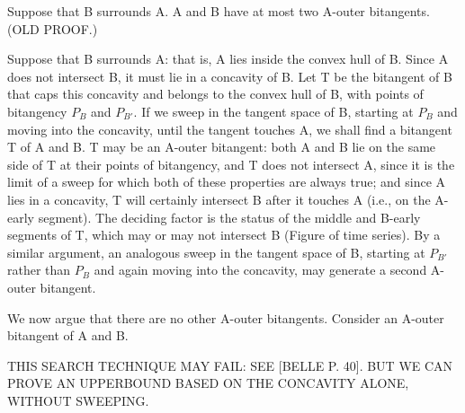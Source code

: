 \documentclass[12pt]{article}
\newif\ifCommentary             %
\begin{document}
\begin{lemma}
\label{lem:Aouter}
\ifCommentary
Let A and B be closed curves whose interiors have no intersection.
\fi
Suppose that B surrounds A.
A and B have at most two A-outer bitangents.  (OLD PROOF.)
\end{lemma}
\prf
Suppose that B surrounds A: that is, A lies inside the convex hull of B.
Since A does not intersect B, it must lie in a concavity of B.
Let T be the bitangent of B that caps this concavity and belongs to the convex hull of B, 
with points of bitangency $P_B$ and $P_{B'}$.
If we sweep in the tangent space of B,
starting at $P_B$ and moving into the concavity, until the tangent touches A,
we shall find a bitangent T of A and B.
T may be an A-outer bitangent: 
both A and B lie on the same side of T at their points of bitangency,
and T does not intersect A, since it is the limit of a sweep for which both of these 
properties are always true; and
since A lies in a concavity, T will certainly intersect B after it touches A
(i.e., on the A-early segment).
The deciding factor is the status of the middle and B-early segments of T,
which may or may not intersect B (Figure of time series).
By a similar argument, an analogous sweep in the tangent space of B, starting at $P_{B'}$ 
rather than $P_B$ and again moving into the concavity, may generate a second
A-outer bitangent.

We now argue that there are no other A-outer bitangents.
Consider an A-outer bitangent of A and B.

THIS SEARCH TECHNIQUE MAY FAIL: SEE [BELLE P. 40].
BUT WE CAN PROVE AN UPPERBOUND BASED ON THE CONCAVITY ALONE, WITHOUT SWEEPING.
\end{document}
